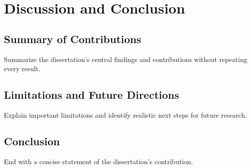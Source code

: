 \chapter{Discussion and Conclusion}\label{chap:discussion}

\section{Summary of Contributions}

Summarize the dissertation's central findings and contributions without repeating every result.

\section{Limitations and Future Directions}

Explain important limitations and identify realistic next steps for future research.

\section{Conclusion}

End with a concise statement of the dissertation's contribution.
